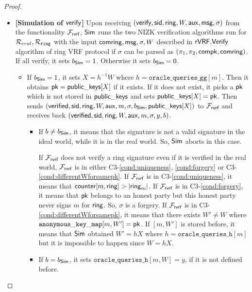 \begin{proof}
\begin{itemize}
		
		\item \textbf{[Simulation of $ \mathsf{verify} $]} Upon receiving  $(\mathsf{verify}, \textsf{sid}, \mathsf{ring},W, \mathsf{aux},\mathsf{msg}, \sigma)$ from the functionality $\mathcal{F}_{\textsf{rvrf}}$, $ \mathsf{Sim} $ runs the two NIZK verification algorithms run for $ \mathcal{R}_{eval}, \mathcal{R}_{\mathtt{ring}} $ with the input $ \mathsf{comring}, \mathsf{msg}, \sigma, W $ described in $ {\mathsf{rVRF}}.{\mathsf{Verify}} $ algorithm of ring VRF protocol if $ \sigma $ can be parsed as $ (\pi_1,\pi_2, \mathsf{compk}, \mathsf{comring}) $. If  all verify, it sets $ b_{\mathsf{Sim}} =1 $. Otherwise it sets $ b_{\mathsf{Sim}} =0  $.
		
		\begin{itemize}
			\item 		If $ b_{\mathsf{Sim}} = 1 $, it sets $ X = h^{-1} W$ where $ h = \mathtt{oracle\_queries\_gg}[m] $. Then it obtains $ \mathsf{pk}  = {\mathsf{public\_keys}}[X]$ if it exists. If it does not exist, it picks a $ \mathsf{pk}  $ which is not stored in $ {\mathsf{public\_keys}} $ and sets $ {\mathsf{public\_keys}}[X] = \mathsf{pk} $. Then sends  $ (\mathsf{verified}, \textsf{sid}, \mathsf{ring}, W,\mathsf{aux}, m, \sigma, b_{\mathsf{Sim}}, {\mathsf{public\_keys}}[X]) $ to $ \mathcal{F}_{\textsf{rvrf}} $ and receives back $ (\mathsf{verified}, \textsf{sid}, \mathsf{ring}, W, \mathsf{aux}, m, \sigma, y, b) $. 
			\begin{itemize}
				\item If $ b \neq b_{\mathsf{Sim}} $, it means that the signature is not a valid signature in the ideal world, while it is in the real world. So, $ \mathsf{Sim} $ aborts in this case.
				
				If $ \mathcal{F}_{\textsf{rvrf}} $ does not verify a ring signature even if  it is verified in the real world, $ \mathcal{F}_{\textsf{rvrf}} $ is in either C3-\ref{cond:uniqueness}, \ref{cond:forgery} or C3-\ref{cond:differentWforsamepk}.
				If $ \mathcal{F}_{\textsf{rvrf}} $ is in C3-\ref{cond:uniqueness}, it means that $ \mathsf{counter}[m,\mathsf{ring}] > |\mathsf{ring}_m| $. If $ \mathcal{F}_{\textsf{rvrf}} $ is in C3-\ref{cond:forgery}, it means that $ \mathsf{pk}$ belongs to an honest party but this honest party never signs $ m $ for  $ \mathsf{ring} $. So, $ \sigma $ is a forgery.	 If $ \mathcal{F}_{\textsf{rvrf}} $ is in C3- \ref{cond:differentWforsamepk}, it means that there exists $ W' \neq W $ where $ \mathtt{anonymous\_key\_map}[m,W'] = \mathsf{pk}$. If $ [m,W'] $ is stored before, it means that $ \mathsf{Sim} $ obtained $ W' = hX $ where $ h = \mathtt{oracle\_queries\_h}[m] $ but it is impossible to happen since $ W = hX $.
				\item If $ b = b_{\mathsf{Sim}} $, it sets $ \mathtt{oracle\_queries\_h}[m,W] = y $, if it is not defined before.
				

\end{itemize}
\end{itemize}
\end{itemize}
\end{proof}
